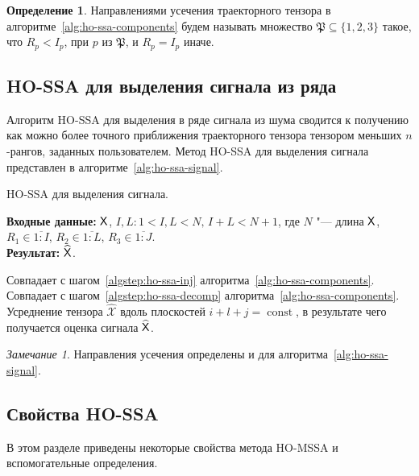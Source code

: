 \documentclass[specialist,
  substylefile=spbu_report.rtx,
subf,href,colorlinks=true, 12pt]{disser}
\theoremstyle{plain}
\theoremstyle{definition}
\newtheorem{definition}{Определение}[section]
\theoremstyle{remark}
\newtheorem{remark}{Замечание}[section]
\newcommand{\Input}{\textbf{Входные данные: }}
\newcommand{\Output}{\textbf{Результат: }}
\begin{document}
\begin{definition}
  Направлениями усечения траекторного тензора в
  алгоритме~\ref{alg:ho-ssa-components}
  будем называть множество $\mathfrak{P}\subseteq \{1, 2, 3\}$ такое, что
  $R_p < I_p$, при $p$ из $\mathfrak{P}$, и $R_p = I_p$ иначе.
\end{definition}

\subsection{HO-SSA для выделения сигнала из ряда}\label{subsec:ho-ssa-signal}
Алгоритм HO-SSA для выделения в ряде сигнала из шума сводится к получению
как можно более точного приближения траекторного тензора тензором
меньших $n$-рангов, заданных пользователем.
Метод HO-SSA для выделения сигнала представлен в
алгоритме~\ref{alg:ho-ssa-signal}.
\begin{algorithm}[!ht]
  \caption{HO-SSA для выделения сигнала.}
  \label{alg:ho-ssa-signal}
  \Input $\mathsf{X}$, $I,L: 1< I,L < N,\, I + L < N + 1$, где $N$ "---
  длина $\mathsf{X}$, $R_1 \in \overline{1:I}$,
  $R_2 \in \overline{1:L}$, $R_3 \in \overline{1:J}$.\\
  \Output $\widehat{\mathsf{X}}$.

  \begin{algorithmic}[1]
    \State Совпадает с шагом~\ref{algstep:ho-ssa-inj}
    алгоритма~\ref{alg:ho-ssa-components}.
    \State Совпадает с шагом~\ref{algstep:ho-ssa-decomp}
    алгоритма~\ref{alg:ho-ssa-components}.
    \State
    Усреднение тензора $\widehat{\mathcal{X}}$ вдоль плоскостей
    $i+l+j=\operatorname{const}$,
    в результате чего получается оценка сигнала $\widehat{\mathsf{X}}$.
  \end{algorithmic}
\end{algorithm}

\begin{remark}
  Направления усечения определены и для алгоритма~\ref{alg:ho-ssa-signal}.
\end{remark}

\subsection{Свойства HO-SSA}
В этом разделе приведены некоторые свойства метода HO-MSSA и
вспомогательные определения.
\end{document}
